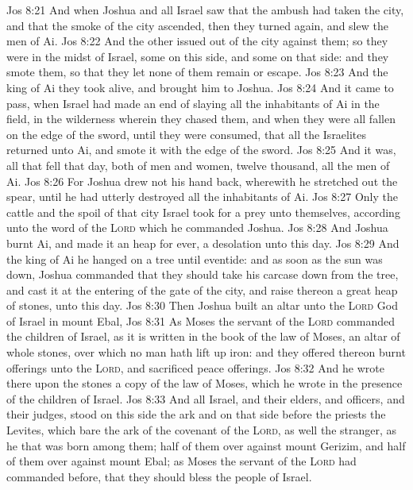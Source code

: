 \vs Jos 8:21 And when Joshua and all Israel saw that the ambush had taken the city, and that the smoke of the city ascended, then they turned again, and slew the men of Ai.
\vs Jos 8:22 And the other issued out of the city against them; so they were in the midst of Israel, some on this side, and some on that side: and they smote them, so that they let none of them remain or escape.
\vs Jos 8:23 And the king of Ai they took alive, and brought him to Joshua.
\vs Jos 8:24 And it came to pass, when Israel had made an end of slaying all the inhabitants of Ai in the field, in the wilderness wherein they chased them, and when they were all fallen on the edge of the sword, until they were consumed, that all the Israelites returned unto Ai, and smote it with the edge of the sword.
\vs Jos 8:25 And  it was,  all that fell that day, both of men and women,  twelve thousand,  all the men of Ai.
\vs Jos 8:26 For Joshua drew not his hand back, wherewith he stretched out the spear, until he had utterly destroyed all the inhabitants of Ai.
\vs Jos 8:27 Only the cattle and the spoil of that city Israel took for a prey unto themselves, according unto the word of the \textsc{Lord} which he commanded Joshua.
\vs Jos 8:28 And Joshua burnt Ai, and made it an heap for ever,  a desolation unto this day.
\vs Jos 8:29 And the king of Ai he hanged on a tree until eventide: and as soon as the sun was down, Joshua commanded that they should take his carcase down from the tree, and cast it at the entering of the gate of the city, and raise thereon a great heap of stones,  unto this day.
\vs Jos 8:30 Then Joshua built an altar unto the \textsc{Lord} God of Israel in mount Ebal,
\vs Jos 8:31 As Moses the servant of the \textsc{Lord} commanded the children of Israel, as it is written in the book of the law of Moses, an altar of whole stones, over which no man hath lift up  iron: and they offered thereon burnt offerings unto the \textsc{Lord}, and sacrificed peace offerings.
\vs Jos 8:32 And he wrote there upon the stones a copy of the law of Moses, which he wrote in the presence of the children of Israel.
\vs Jos 8:33 And all Israel, and their elders, and officers, and their judges, stood on this side the ark and on that side before the priests the Levites, which bare the ark of the covenant of the \textsc{Lord}, as well the stranger, as he that was born among them; half of them over against mount Gerizim, and half of them over against mount Ebal; as Moses the servant of the \textsc{Lord} had commanded before, that they should bless the people of Israel.
